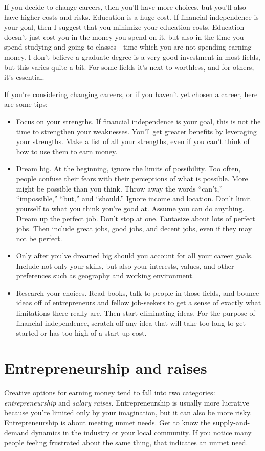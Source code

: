 If you decide to change careers, then you'll have more choices, but you'll also have higher costs and risks. Education is a huge cost. If financial independence is your goal, then I suggest that you minimize your education costs. Education doesn't just cost you in the money you spend on it, but also in the time you spend studying and going to classes---time which you are not spending earning money. I don't believe a graduate degree is a very good investment in most fields, but this varies quite a bit. For some fields it's next to worthless, and for others, it's essential.

If you're considering changing careers, or if you haven't yet chosen a career, here are some tips:
\begin{itemize}
\item Focus on your strengths. If financial independence is your goal, this is not the time to strengthen your weaknesses. You'll get greater benefits by leveraging your strengths. Make a list of all your strengths, even if you can't think of how to use them to earn money.
\item Dream big. At the beginning, ignore the limits of possibility. Too often, people confuse their fears with their perceptions of what is possible. More might be possible than you think. Throw away the words ``can't,'' ``impossible,'' ``but,'' and ``should.'' Ignore income and location. Don't limit yourself to what you think you're good at. Assume you can do anything. Dream up the perfect job. Don't stop at one. Fantasize about lots of perfect jobs. Then include great jobs, good jobs, and decent jobs, even if they may not be perfect.
\item Only after you've dreamed big should you account for all your career goals. Include not only your skills, but also your interests, values, and other preferences such as geography and working environment.
\item Research your choices. Read books, talk to people in those fields, and bounce ideas off of entrepreneurs and fellow job-seekers to get a sense of exactly what limitations there really are. Then start eliminating ideas. For the purpose of financial independence, scratch off any idea that will take too long to get started or has too high of a start-up cost.
\end{itemize}

\section{Entrepreneurship and raises}
Creative options for earning money tend to fall into two categories: \emph{entrepreneurship} and \emph{salary raises.} Entrepreneurship is usually more lucrative because you're limited only by your imagination, but it can also be more risky. Entrepreneurship is about meeting unmet needs. Get to know the supply-and-demand dynamics in the industry or your local community. If you notice many people feeling frustrated about the same thing, that indicates an unmet need.

